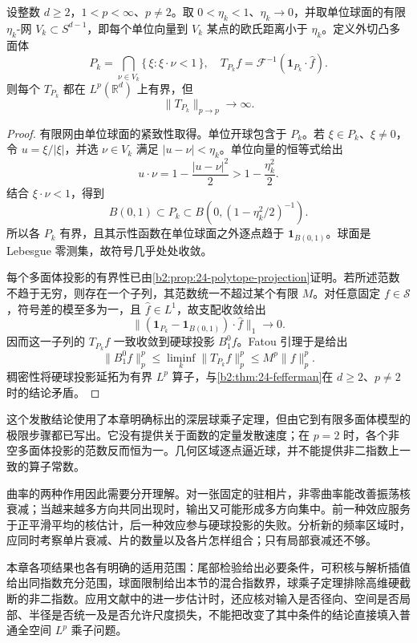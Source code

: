 \begin{proposition}[逼近球的多面体范数发散]\label{b2:prop:24-polytope-divergence}
设整数 \(d\geq2\)，\(1<p<\infty\)、\(p\neq2\)。取 \(0<\eta_k<1\)、\(\eta_k\to0\)，并取单位球面的有限 \(\eta_k\)-网 \(V_k\subset S^{d-1}\)，即每个单位向量到 \(V_k\) 某点的欧氏距离小于 \(\eta_k\)。定义外切凸多面体
\[
 P_k=\bigcap_{\nu\in V_k}\{\,\xi:\xi\cdot\nu<1\,\},\quad
 T_{P_k}f=\mathcal F^{-1}(\mathbf1_{P_k}\cdot\widehat f).
\]
则每个 \(T_{P_k}\) 都在 \(L^p(\mathbb R^d)\) 上有界，但
\[
 \|T_{P_k}\|_{p\to p}\longrightarrow\infty.
\]
\end{proposition}
\begin{proof}
有限网由单位球面的紧致性取得。单位开球包含于 \(P_k\)。若 \(\xi\in P_k\)、\(\xi\neq0\)，令 \(u=\xi/|\xi|\)，并选 \(\nu\in V_k\) 满足 \(|u-\nu|<\eta_k\)。单位向量的恒等式给出
\[
 u\cdot\nu=1-\frac{|u-\nu|^2}{2}
 >1-\frac{\eta_k^2}{2}.
\]
结合 \(\xi\cdot\nu<1\)，得到
\[
 B(0,1)\subset P_k
 \subset B\!\left(0,(1-\eta_k^2/2)^{-1}\right).
\]
所以各 \(P_k\) 有界，且其示性函数在单位球面之外逐点趋于 \(\mathbf1_{B(0,1)}\)。球面是 Lebesgue 零测集，故符号几乎处处收敛。

每个多面体投影的有界性已由\cref{b2:prop:24-polytope-projection}证明。若所述范数不趋于无穷，则存在一个子列，其范数统一不超过某个有限 \(M\)。对任意固定 \(f\in\mathcal S\)，符号差的模至多为一，且 \(\widehat f\in L^1\)，故支配收敛给出
\[
 \|( \mathbf1_{P_k}-\mathbf1_{B(0,1)})\cdot\widehat f\|_1\longrightarrow0.
\]
因而这一子列的 \(T_{P_k}f\) 一致收敛到硬球投影 \(B_1^0f\)。Fatou 引理于是给出
\[
 \|B_1^0f\|_p^p
 \leq\liminf_k\|T_{P_k}f\|_p^p
 \leq M^p\|f\|_p^p.
\]
稠密性将硬球投影延拓为有界 \(L^p\) 算子，与\cref{b2:thm:24-fefferman}在 \(d\geq2\)、\(p\neq2\) 时的结论矛盾。
\end{proof}

这个发散结论使用了本章明确标出的深层球乘子定理，但由它到有限多面体模型的极限步骤都已写出。它没有提供关于面数的定量发散速度；在 \(p=2\) 时，各个非空多面体投影的范数反而恒为一。几何区域逐点逼近球，并不能提供非二指数上一致的算子常数。

\ProseParagraphBreak
曲率的两种作用因此需要分开理解。对一张固定的驻相片，非零曲率能改善振荡核衰减；当越来越多方向共同出现时，输出又可能形成多方向集中。前一种效应服务于正平滑平均的核估计，后一种效应参与硬球投影的失败。分析新的频率区域时，应同时考察单片衰减、片的数量以及各片怎样组合；只有局部衰减还不够。

\ProseParagraphBreak
本章各项结果也各有明确的适用范围：尾部检验给出必要条件，可积核与解析插值给出同指数充分范围，球面限制给出本节的混合指数界，球乘子定理排除高维硬截断的非二指数。应用文献中的进一步估计时，还应核对输入是否径向、空间是否局部、半径是否统一及是否允许尺度损失，不能把改变了其中条件的结论直接填入普通全空间 \(L^p\) 乘子问题。
